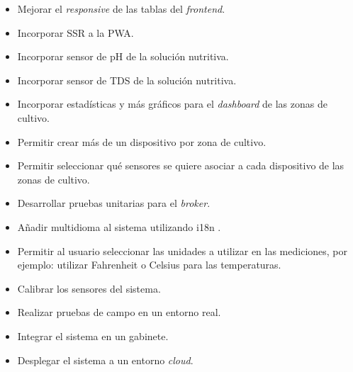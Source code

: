 \begin{itemize}
\item Mejorar el \emph{responsive} de las tablas del \emph{frontend}.
\item Incorporar SSR a la PWA.
\item Incorporar sensor de pH de la solución nutritiva.
\item Incorporar sensor de TDS de la solución nutritiva.
\item Incorporar estadísticas y más gráficos para el \emph{dashboard} de las zonas de cultivo.
\item Permitir crear más de un dispositivo por zona de cultivo.
\item Permitir seleccionar qué sensores se quiere asociar a cada dispositivo de las zonas de cultivo.
\item Desarrollar pruebas unitarias para el \emph{broker}.
\item Añadir multidioma al sistema utilizando i18n \citep{WEBSITE:ANGULARI18N}.
\item Permitir al usuario seleccionar las unidades a utilizar en las mediciones, por ejemplo: utilizar Fahrenheit o Celsius para las temperaturas.
\item Calibrar los sensores del sistema.
\item Realizar pruebas de campo en un entorno real.
\item Integrar el sistema en un gabinete.
\item Desplegar el sistema a un entorno \emph{cloud}.
\end{itemize}